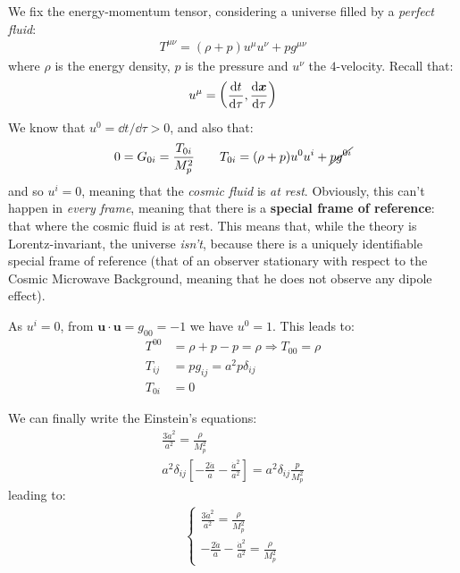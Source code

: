 \documentclass[../template.tex]{subfiles}
\begin{document}
We fix the energy-momentum tensor, considering a universe filled by a \textit{perfect fluid}:
\begin{align*}
    T^{\mu \nu} = (\rho + p) u^\mu u^\nu + p g^{\mu \nu}
\end{align*} 
where $\rho$ is the energy density, $p$ is the pressure  and $u^\nu$ the $4$-velocity. Recall that:
\begin{align*}
    u^\mu = \left(\dv{t}{\tau} , \dv{\bm{x}}{\tau}\right)
\end{align*}   
We know that $u^0 = \dd{t}/\dd{\tau} > 0$, and also that:
\begin{align*}
    0 = G_{0i} = \frac{T_{0i}}{M_p^2} \qquad T_{0i} = (\rho + p)u^0 u^i+ \cancel{p g^{0i}}
\end{align*} 
and so $u^i = 0$, meaning that the \textit{cosmic fluid} is \textit{at rest}. Obviously, this can't happen in \textit{every frame}, meaning that there is a \textbf{special frame of reference}: that where the cosmic fluid is at rest. This means that, while the theory is Lorentz-invariant, the universe \textit{isn't}, because there is a uniquely identifiable special frame of reference (that of an observer stationary with respect to the Cosmic Microwave Background, meaning that he does not observe any dipole effect).

As $u^i = 0$, from $\bm{u}\cdot \bm{u} = g_{00} = -1$ we have $u^0 = 1$. This leads to:
\begin{align*}
    T^{00} &= \rho + p -p = \rho \Rightarrow T_{00} = \rho\\
    T_{ij} &= p g_{ij} = a^2 p \delta_{ij}\\
    T_{0i} &= 0
\end{align*}   

We can finally write the Einstein's equations:
\begin{align*}
    \frac{3\dot{a}^2}{a^2} = \frac{\rho}{M_p^2}\\
    a^2 \delta_{ij} \left[-\frac{2 \ddot{a}}{a}-\frac{\dot{a}^2}{a^2}  \right] = a^2 \delta_{ij} \frac{p}{M_p^2}   
\end{align*}
leading to:
\begin{align*}
    \begin{cases} \displaystyle
        \frac{3 \dot{a}^2}{a^2} = \frac{\rho}{M_p^2} \\
        \displaystyle -\frac{2 \ddot{a}}{a} - \frac{\dot{a}^2}{a^2} = \frac{\rho}{M_p^2}    
    \end{cases}
\end{align*}
\end{document}
